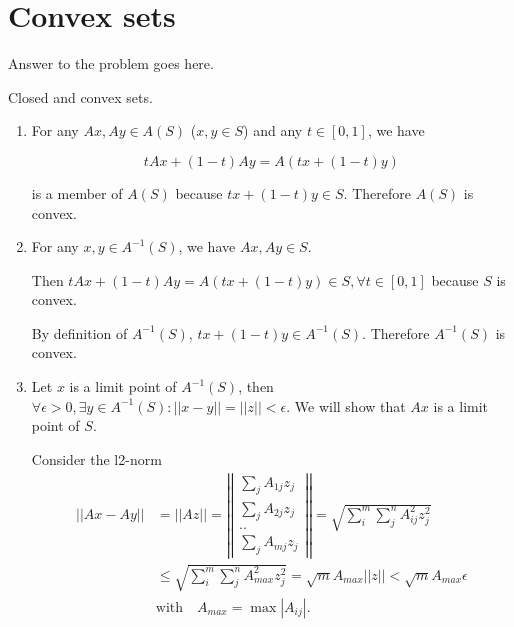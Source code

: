 \documentclass[12pt,letterpaper]{article}
\begin{document}
\section*{Convex sets}

Answer to the problem goes here.

\begin{alphalist}

\item Closed and convex sets.
\begin{enumerate}[label=(\roman*)]
    \item
        For any $Ax, Ay \in A(S)$ ($x, y \in S$) and any $t \in [0, 1]$, we have

        \[t Ax + (1 - t) Ay = A (t x + (1- t)y)\]

        is a member of $A(S)$ because $t x + (1-t) y \in S$.
        Therefore $A(S)$ is convex.

    \item
        For any $x, y \in A^{-1}(S)$, we have $Ax, Ay \in S$.

        Then $t Ax + (1-t)Ay = A(t x + (1-t)y) \in S,
        \forall t \in [0, 1]$ because $S$ is convex.

        By definition of $A^{-1}(S)$, $t x + (1-t)y \in A^{-1}(S)$. Therefore $A^{-1}(S)$ is convex.

    \item
        Let $x$ is a limit point of $A^{-1}(S)$, then $\forall{}\epsilon{}>0,
        \exists{}y \in A^{-1}(S): ||x - y|| = ||z|| < \epsilon$. We will show
        that $Ax$ is a limit point of $S$.

        Consider the l2-norm
        \[
        \begin{split}
            ||Ax - Ay|| &= ||Az||  = \left|\left|\begin{matrix} \sum_j A_{1j}z_j \\ \sum_j A_{2j}z_j \\ .. \\ \sum_j A_{mj}z_j\end{matrix}\right|\right|
                        = \sqrt{\sum_i^m\sum_j^nA_{ij}^2 z_j^2} \\
                        &\le \sqrt{\sum_i^m \sum_j^n A_{max}^2 z_j^2} =\sqrt{m} A_{max} ||z|| < \sqrt{m}A_{max}\epsilon \\
                        &\text{with} \quad A_{max} = \max{|A_{ij}|}.
        \end{split}
    \]


\end{enumerate}
\end{alphalist}
\end{document}
